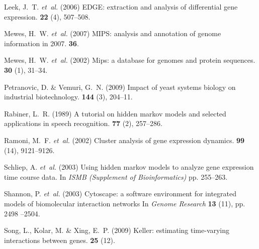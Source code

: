 \documentclass{bioinfo}
\begin{document}
\begin{thebibliography}{}
Leek, J.~T. {\em et~al.} (2006{\em{}}) {EDGE:
  extraction and analysis of differential gene expression}.
 {\bf 22} (4), 507--508.



Mewes, H.~W. {\em et~al.} (2007{\em{}}) {MIPS: analysis and annotation of genome information in
  2007}.
 {\bf 36}.

Mewes, H.~W. {\em et~al.} (2002{\em{}}) Mips: a database for genomes and protein sequences.
 {\bf 30} (1), 31--34.

Petranovic, D. \& Vemuri, G.~N. (2009{\em{}}) Impact of yeast systems biology
  on industrial biotechnology.
 {\bf 144} (3), 204--11.

Rabiner, L.~R. (1989{\em{}}) A tutorial on hidden markov models and selected
  applications in speech recognition.
 {\bf 77} (2), 257--286.

Ramoni, M.~F. {\em et~al.} (2002{\em{}}) Cluster analysis
  of gene expression dynamics.
 {\bf 99} (14), 9121--9126.

Schliep, A. {\em et~al.} (2003{\em{}}) Using hidden
  markov models to analyze gene expression time course data.
\newblock In {\em ISMB (Supplement of Bioinformatics)} pp. 255--263.

Shannon, P. {\em et~al.} (2003{\em{}}) Cytoscape: a software
environment for integrated models of biomolecular interaction networks 
\newblock In {\em Genome Research}  {\bf 13} (11), pp. 2498 --2504.

Song, L., Kolar, M.  \& Xing, E.~P. (2009{\em{}}) Keller: estimating
  time-varying interactions between genes.
 {\bf 25} (12).


\end{thebibliography}
\end{document}
